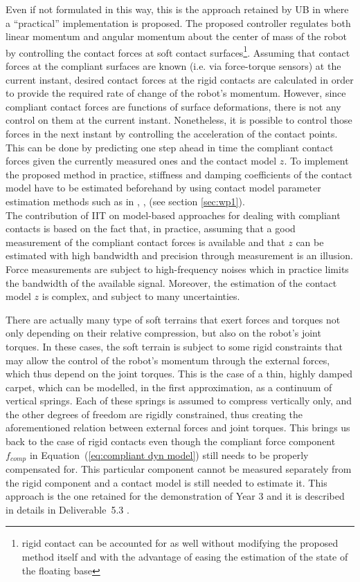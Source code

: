 Even if not formulated in this way, this is the approach retained by UB in \cite{AzadIROS2015} where a ``practical'' implementation is proposed. The proposed controller regulates both linear momentum and angular momentum about the center of mass of the robot by controlling the contact forces at soft contact surfaces\footnote{rigid contact can be accounted for as well without modifying the proposed method itself and with the advantage of easing the estimation of the state of the floating base}. Assuming that contact forces at the compliant surfaces are known (i.e. via force-torque sensors) at the current instant, desired contact forces at the rigid contacts are calculated in order to provide the required rate of change of the robot's momentum.  However, since compliant contact forces are functions of surface deformations, there is not  any control on them at the current instant. Nonetheless, it is possible to control those forces in the next instant by controlling the acceleration of the contact points.  This can be done by predicting one step ahead in time the compliant contact forces given the currently measured ones and the contact model $z$. To implement the proposed method in practice, stiffness and damping coefficients of the contact model have to be estimated beforehand by using contact model parameter estimation methods such as in \cite{Dallalietal13}, \cite{Diolaitietal05}, \cite{Ericksonetal03} (see section \ref{sec:wp1}).\\

The contribution of IIT on model-based approaches for dealing with compliant contacts is based on the fact that, in practice, assuming that a good measurement of the compliant contact forces is available and that $z$ can be estimated with high bandwidth and precision through measurement is an illusion. Force measurements are subject to high-frequency noises which in practice limits the bandwidth of the available signal. Moreover, the estimation of the contact model $z$ is complex, and subject to many uncertainties.

There are actually many type of soft terrains that exert forces and torques not only depending on their relative compression, but also on the robot’s joint torques. In these cases, the soft terrain is subject to some rigid constraints that may allow the control of the robot's momentum through the external forces, which thus depend on the joint torques. This is the case of a thin, highly damped carpet, which can be modelled, in the first approximation, as a continuum of vertical springs. Each of these springs is assumed to compress vertically only, and the other degrees of freedom are rigidly constrained, thus creating the aforementioned relation between external forces and joint torques. This brings us back to the case of rigid contacts even though the compliant force component $f_{comp}$ in Equation~(\ref{eq:compliant dyn model}) still needs to be properly compensated for. This particular component cannot be measured separately from the rigid component and a contact model is still needed to estimate it. This approach is the one retained for the demonstration of Year 3 and it is described in details in Deliverable~5.3 \cite{deliverable53}.

